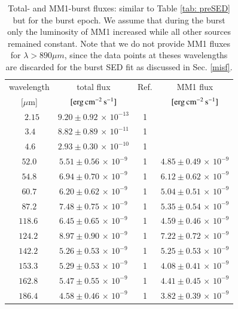 \begin{appendix}
\begin{table}
\end{table}

\begin{table}
\begin{threeparttable}[b]
\caption[]{Total- and MM1-burst fluxes: similar to Table \ref{tab: preSED} but for the burst epoch. We assume that during the burst only the luminosity of MM1 increased while all other sources remained constant. Note that we do not provide MM1 fluxes for $\lambda>890\mu m$, since the data points at theses wavelengths are discarded for the burst SED fit as discussed in Sec. \ref{misf}.}%
\label{tab: burstSED}
\begin{tabular}{cccc}
\hline
\noalign{\smallskip}
wavelength & total flux & Ref. & MM1 flux \\
$[\mu$m] & $[{\rm erg \, cm^{-2} \, s^{-1}}]$ & & $[{\rm erg \, cm^{-2}\, s^{-1}}]$ \\
\noalign{\smallskip}
\hline
\noalign{\smallskip}
$ ~~~2.15 $\tablefootmark{*}& $ 9.20 \pm 0.92\,{\times}\,10^{-13}$  & 1 &\\
$ ~~3.4~ $\tablefootmark{*}& $ 8.82 \pm 0.89 \,{\times}\,10^{-11}$  & 1 &\\ 
$ ~~4.6~ $\tablefootmark{*}& $ 2.93 \pm 0.30\,{\times}\,10^{-10}$  & 1 &\\
$ 52.0 $& $ 5.51 \pm 0.56\,{\times}\,10^{-9}$  & 1 & $ 4.85 \pm 0.49\,{\times}\,10^{-9}$ \\
$ 54.8 $& $ 6.94 \pm 0.70\,{\times}\,10^{-9}$  & 1 & $ 6.12 \pm 0.62\,{\times}\,10^{-9}$ \\
$ 60.7 $& $ 6.20 \pm 0.62\,{\times}\,10^{-9}$  & 1 & $ 5.04 \pm 0.51\,{\times}\,10^{-9}$ \\ 
$ 87.2 $ & $ 7.48 \pm 0.75\,{\times}\,10^{-9}$  & 1 & $ 5.35 \pm 0.54\,{\times}\,10^{-9}$ \\ 
$ 118.6~ $ & $ 6.45 \pm 0.65\,{\times}\,10^{-9}$  & 1& $ 4.59 \pm 0.46\,{\times}\,10^{-9}$ \\ 
$ 124.2~ $& $ 8.97 \pm 0.90 \,{\times}\,10^{-9}$  & 1  & $ 7.22 \pm 0.72\,{\times}\,10^{-9}$ \\ 
$ 142.2~ $  & $ 5.26 \pm 0.53\,{\times}\,10^{-9}$  & 1 & $ 5.25 \pm 0.53\,{\times}\,10^{-9}$ \\ 
$ 153.3~ $ & $ 5.29 \pm 0.53\,{\times}\,10^{-9}$  & 1 & $ 4.08 \pm 0.41\,{\times}\,10^{-9}$ \\ 
$ 162.8~ $  & $ 5.47 \pm 0.55\,{\times}\,10^{-9}$  & 1& $ 4.41 \pm 0.45\,{\times}\,10^{-9}$ \\ 
$ 186.4~ $& $ 4.58 \pm 0.46 \,{\times}\,10^{-9}$  & 1 & $ 3.82 \pm 0.39\,{\times}\,10^{-9}$ \\ 

\end{tabular}
\end{threeparttable}
\end{table}
\end{appendix}
